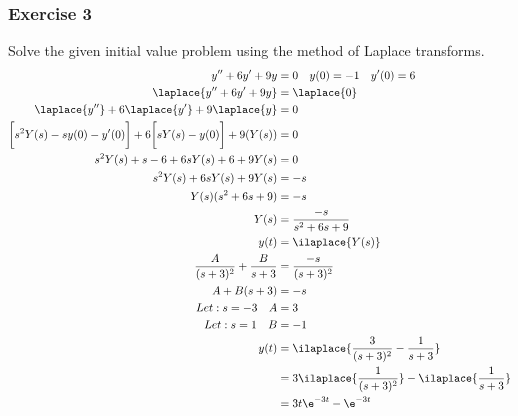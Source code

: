 \documentclass{math}
\begin{document}
\subsubsection*{Exercise 3}
Solve the given initial value problem using the method of Laplace transforms.
\begin{align*}
  y''+6y'+9y &= 0 \quad y(0) = -1 \quad y'(0) = 6 \\
  \laplace{y''+6y'+9y} &= \laplace{0} \\
  \laplace{y''}+6\laplace{y'}+9\laplace{y} &= 0 \\
  \bigg[s^2Y(s)-sy(0)-y'(0)\bigg]+6\bigg[sY(s)-y(0)\bigg]+9(Y(s)) &= 0 \\
  s^2Y(s)+s-6+6sY(s)+6+9Y(s) &= 0 \\
  s^2Y(s)+6sY(s)+9Y(s) &= -s \\
  Y(s)(s^2+6s+9) &= -s \\
  Y(s) &= \frac{-s}{s^2+6s+9} \\
  y(t) &= \ilaplace{Y(s)} \\
  \frac{A}{(s+3)^2}+\frac{B}{s+3} &= \frac{-s}{(s+3)^2} \\
  A+B(s+3) &= -s \\
  Let: s = -3 \quad A &= 3 \\
  Let: s = 1 \quad B &= -1 \\
  y(t) &= \ilaplace{\frac{3}{(s+3)^2}-\frac{1}{s+3}} \\
  &= 3\ilaplace{\frac{1}{(s+3)^2}}-\ilaplace{\frac{1}{s+3}} \\
  &= 3t\e^{-3t}-\e^{-3t}
\end{align*}
\end{document}
